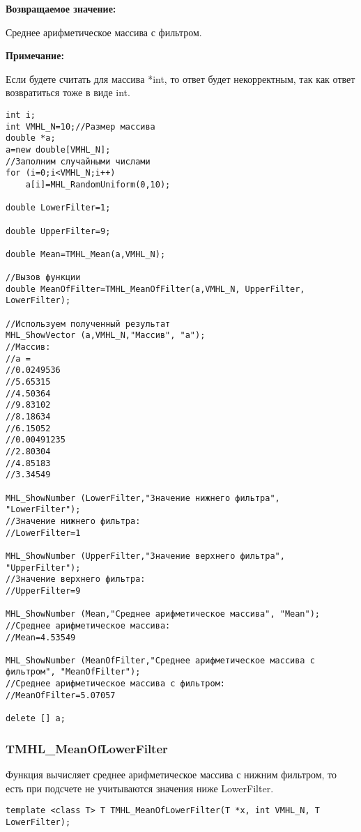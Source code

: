\documentclass[a4paper,12pt]{article}
\begin{document}
\textbf{Возвращаемое значение:}

 Среднее арифметическое массива с фильтром.
 
\textbf{Примечание:}

Если будете считать для массива *int, то ответ будет некорректным, так как ответ возвратиться тоже в виде int.
 



\begin{lstlisting}[label=code_use_TMHL_MeanOfFilter,caption=Пример использования]
int i;
int VMHL_N=10;//Размер массива
double *a;
a=new double[VMHL_N];
//Заполним случайными числами
for (i=0;i<VMHL_N;i++)
    a[i]=MHL_RandomUniform(0,10);

double LowerFilter=1;

double UpperFilter=9;

double Mean=TMHL_Mean(a,VMHL_N);

//Вызов функции
double MeanOfFilter=TMHL_MeanOfFilter(a,VMHL_N, UpperFilter, LowerFilter);

//Используем полученный результат
MHL_ShowVector (a,VMHL_N,"Массив", "a");
//Массив:
//a =	
//0.0249536
//5.65315
//4.50364
//9.83102
//8.18634
//6.15052
//0.00491235
//2.80304
//4.85183
//3.34549

MHL_ShowNumber (LowerFilter,"Значение нижнего фильтра", "LowerFilter");
//Значение нижнего фильтра:
//LowerFilter=1

MHL_ShowNumber (UpperFilter,"Значение верхнего фильтра", "UpperFilter");
//Значение верхнего фильтра:
//UpperFilter=9

MHL_ShowNumber (Mean,"Среднее арифметическое массива", "Mean");
//Среднее арифметическое массива:
//Mean=4.53549

MHL_ShowNumber (MeanOfFilter,"Среднее арифметическое массива с фильтром", "MeanOfFilter");
//Среднее арифметическое массива с фильтром:
//MeanOfFilter=5.07057

delete [] a;
\end{lstlisting}

\subsubsection{TMHL\_MeanOfLowerFilter}\label{TMHL_MeanOfLowerFilter}

Функция вычисляет среднее арифметическое массива с нижним фильтром, то есть при подсчете не учитываются значения ниже LowerFilter.


\begin{lstlisting}[label=code_syntax_TMHL_MeanOfLowerFilter,caption=Синтаксис]
template <class T> T TMHL_MeanOfLowerFilter(T *x, int VMHL_N, T LowerFilter);
\end{lstlisting}
\end{document}

